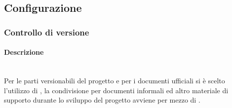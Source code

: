 \subsection{Configurazione}
\label{sec:configurazione}
\subsubsection{Controllo di versione}
\paragraph{Descrizione}\mbox{}\\[0.4cm]
Per le parti versionabili del progetto e per i documenti ufficiali si è scelto l’utilizzo di , la condivisione per documenti informali ed altro materiale di supporto durante lo sviluppo del progetto avviene per mezzo di .
